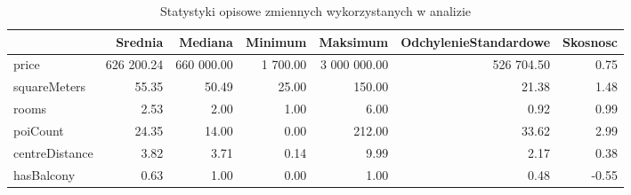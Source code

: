\documentclass{report}
\begin{document}

\begin{table}[H]

\caption{Statystyki opisowe zmiennych wykorzystanych w analizie}
\centering
\begin{tabular}[t]{lrrrrrr}
\toprule
  & Srednia & Mediana & Minimum & Maksimum & OdchylenieStandardowe & Skosnosc\\
\midrule
price & 626 200.24 & 660 000.00 & 1 700.00 & 3 000 000.00 & 526 704.50 & 0.75\\
squareMeters & 55.35 & 50.49 & 25.00 & 150.00 & 21.38 & 1.48\\
rooms & 2.53 & 2.00 & 1.00 & 6.00 & 0.92 & 0.99\\
poiCount & 24.35 & 14.00 & 0.00 & 212.00 & 33.62 & 2.99\\
centreDistance & 3.82 & 3.71 & 0.14 & 9.99 & 2.17 & 0.38\\
hasBalcony & 0.63 & 1.00 & 0.00 & 1.00 & 0.48 & -0.55\\
\bottomrule
\end{tabular}
\end{table}


\end{document}
